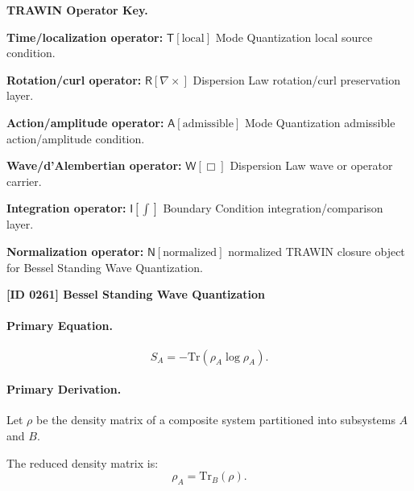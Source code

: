 \par\vspace{0.45\baselineskip}
\noindent\begin{minipage}[t]{\linewidth}
\begingroup
\small
\raggedright
\textbf{TRAWIN Operator Key.}\par
\noindent\textbf{Time/localization operator:} $\mathsf{T}\!\left[\mathrm{local}\right]$ Mode Quantization local source condition.\par
\noindent\textbf{Rotation/curl operator:} $\mathsf{R}\!\left[\nabla\times\right]$ Dispersion Law rotation/curl preservation layer.\par
\noindent\textbf{Action/amplitude operator:} $\mathsf{A}\!\left[\mathrm{admissible}\right]$ Mode Quantization admissible action/amplitude condition.\par
\noindent\textbf{Wave/d'Alembertian operator:} $\mathsf{W}\!\left[\Box\right]$ Dispersion Law wave or operator carrier.\par
\noindent\textbf{Integration operator:} $\mathsf{I}\!\left[\int\right]$ Boundary Condition integration/comparison layer.\par
\noindent\textbf{Normalization operator:} $\mathsf{N}\!\left[\mathrm{normalized}\right]$ normalized TRAWIN closure object for Bessel Standing Wave Quantization.\par
\endgroup
\end{minipage}

\clearpage
\noindent\textbf{[ID 0261] Bessel Standing Wave Quantization}\par
\vspace{0.35em}
\paragraph{Primary Equation.}
\begin{equation}
S_A = -\mathrm{Tr}(\rho_A \log \rho_A).
\end{equation}

\paragraph{Primary Derivation.}
Let $\rho$ be the density matrix of a composite system partitioned into subsystems $A$ and $B$.

The reduced density matrix is:
\begin{equation}
\rho_A = \mathrm{Tr}_B(\rho).
\end{equation}

